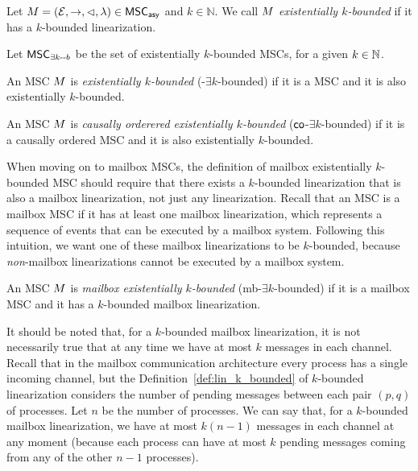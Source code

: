 \documentclass{article}
\begin{document}
\begin{definition}\label{def:ek_bounded_msc}
	Let $M = (\mathcal{E}, \rightarrow, \lhd, \lambda) \in \mathsf{MSC}_{\mathsf{asy}}$ and $k \in \mathbb{N}$. We call $M$ \emph{existentially $k$-bounded} if it has a $k$-bounded linearization.
\end{definition}
Let $\mathsf{MSC}_{\exists k\text{-}\text{-}b}$ be the set of existentially $k$-bounded MSCs, for a given $k \in \mathbb{N}$.
\begin{definition}
	An MSC $M$ is \emph{\pp existentially $k$-bounded} (\pp-$\exists k$-bounded) if it is a \pp MSC and it is also existentially $k$-bounded.
\end{definition}
\begin{definition}
	An MSC $M$ is \emph{causally orderered existentially $k$-bounded} ($\mathsf{co}$-$\exists k$-bounded) if it is a causally ordered MSC and it is also existentially $k$-bounded.
\end{definition}
When moving on to mailbox MSCs, the definition of mailbox existentially $k$-bounded MSC should require that there exists a $k$-bounded linearization that is also a mailbox linearization, not just any linearization. Recall that an MSC is a mailbox MSC if it has at least one mailbox linearization, which represents a sequence of events that can be executed by a mailbox system. Following this intuition, we want one of these mailbox linearizations to be $k$-bounded, because \emph{non}-mailbox linearizations cannot be executed by a mailbox system.
\begin{definition}
	An MSC $M$ is \emph{mailbox existentially $k$-bounded} (mb-$\exists k$-bounded) if it is a mailbox MSC and it has a $k$-bounded mailbox linearization.
\end{definition}
It should be noted that, for a $k$-bounded mailbox linearization, it is not necessarily true that at any time we have at most $k$ messages in each channel. Recall that in the mailbox communication architecture every process has a single incoming channel, but the Definition~\ref{def:lin_k_bounded} of $k$-bounded linearization considers the number of pending messages between each pair $(p,q)$ of processes. Let $n$ be the number of processes. We can say that, for a $k$-bounded mailbox linearization, we have at most $k(n-1)$ messages in each channel at any moment (because each process can have at most $k$ pending messages coming from any of the other $n-1$ processes).
\end{document}
